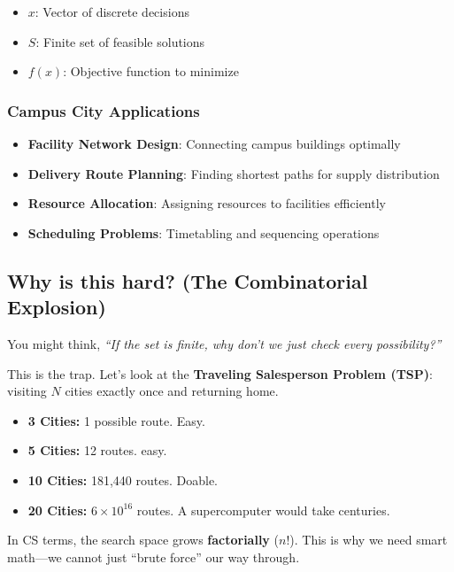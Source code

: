 \documentclass[
  letterpaper,
  DIV=11,
  numbers=noendperiod]{scrreprt}
\providecommand{\tightlist}{%
  \setlength{\itemsep}{0pt}\setlength{\parskip}{0pt}}
\begin{document}
\begin{itemize}
\tightlist
\item
  \(x\): Vector of discrete decisions
\item
  \(S\): Finite set of feasible solutions
\item
  \(f(x)\): Objective function to minimize
\end{itemize}

\subsubsection{Campus City
Applications}\label{campus-city-applications-1}

\begin{itemize}
\tightlist
\item
  \textbf{Facility Network Design}: Connecting campus buildings
  optimally
\item
  \textbf{Delivery Route Planning}: Finding shortest paths for supply
  distribution
\item
  \textbf{Resource Allocation}: Assigning resources to facilities
  efficiently
\item
  \textbf{Scheduling Problems}: Timetabling and sequencing operations
\end{itemize}

\subsection{Why is this hard? (The Combinatorial
Explosion)}\label{why-is-this-hard-the-combinatorial-explosion}

You might think, \emph{``If the set is finite, why don't we just check
every possibility?''}

This is the trap. Let's look at the \textbf{Traveling Salesperson
Problem (TSP)}: visiting \(N\) cities exactly once and returning home.

\begin{itemize}
\tightlist
\item
  \textbf{3 Cities:} 1 possible route. Easy.
\item
  \textbf{5 Cities:} 12 routes. easy.
\item
  \textbf{10 Cities:} 181,440 routes. Doable.
\item
  \textbf{20 Cities:} \(6 \times 10^{16}\) routes. A supercomputer would
  take centuries.
\end{itemize}

In CS terms, the search space grows \textbf{factorially} (\(n!\)). This
is why we need smart math---we cannot just ``brute force'' our way
through.
\end{document}
